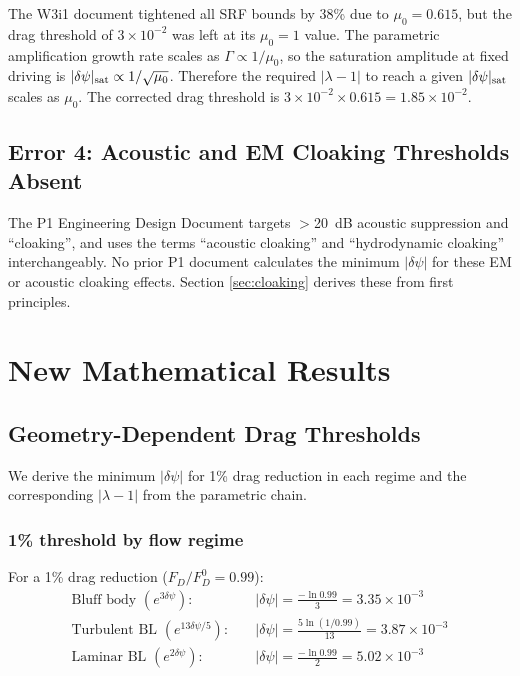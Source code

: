 \documentclass[11pt,twocolumn]{article}
\newcommand{\dpsi}{\delta\psi}
\newcommand{\lam}{\lambda}
\begin{document}
The W3i1 document tightened all SRF bounds by 38\% due to $\mu_0 = 0.615$,
but the drag threshold of $3\times10^{-2}$ was left at its
$\mu_0 = 1$ value. The parametric amplification growth rate scales as
$\Gamma \propto 1/\mu_0$, so the saturation amplitude at fixed driving is
$|\dpsi|_{\rm sat} \propto 1/\sqrt{\mu_0}$. Therefore the required
$|\lam-1|$ to reach a given $|\dpsi|_{\rm sat}$ scales as $\mu_0$. The
corrected drag threshold is $3\times10^{-2}\times 0.615 = 1.85\times10^{-2}$.

\subsection{Error 4: Acoustic and EM Cloaking Thresholds Absent}

The P1 Engineering Design Document targets $>$20~dB acoustic suppression and
``cloaking'', and uses the terms ``acoustic cloaking'' and
``hydrodynamic cloaking'' interchangeably. No prior P1 document calculates
the minimum $|\dpsi|$ for these EM or acoustic cloaking effects. Section
\ref{sec:cloaking} derives these from first principles.

\section{New Mathematical Results}
\label{sec:newmath}

\subsection{Geometry-Dependent Drag Thresholds}

We derive the minimum $|\dpsi|$ for 1\% drag reduction in each regime and
the corresponding $|\lam-1|$ from the parametric chain.

\subsubsection{1\% threshold by flow regime}

For a 1\% drag reduction ($F_D/F_D^0 = 0.99$):
\begin{align}
\text{Bluff body }(e^{3\dpsi}): &\quad |\dpsi| = \frac{-\ln 0.99}{3} = 3.35\times10^{-3} \\
\text{Turbulent BL }(e^{13\dpsi/5}): &\quad |\dpsi| = \frac{5\ln(1/0.99)}{13} = 3.87\times10^{-3} \\
\text{Laminar BL }(e^{2\dpsi}): &\quad |\dpsi| = \frac{-\ln 0.99}{2} = 5.02\times10^{-3}
\end{align}
\end{document}
